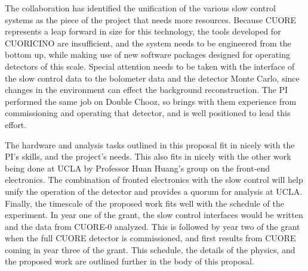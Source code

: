 The collaboration has identified the unification of the various slow control systems as the piece of the project that needs more resources. Because CUORE represents a leap forward in size for this technology, the tools developed for CUORICINO are insufficient, and the system needs to be engineered from the bottom up, while making use of new software packages designed for operating detectors of this scale. Special attention needs to be taken with the interface of the slow control data to the bolometer data and the detector Monte Carlo, since changes in the environment can effect the background reconstruction. The PI performed the same job on Double Chooz, so brings with them experience from commissioning and operating that detector, and is well positioned to lead this effort.    

The hardware and analysis tasks outlined in this proposal fit in nicely with the PI's skills, and the project's needs. This also fits in nicely with the other work being done at UCLA  by Professor Huan Huang's group on the front-end electronics. The combination of fronted electronics with the slow control will help unify the operation of the detector and provides a quorum  for analysis at UCLA. Finally, the timescale of the proposed work fits well with the schedule of the experiment. In year one of the grant, the slow control interfaces would be written and the data from CUORE-0 analyzed. This is followed by year two of the grant when the full CUORE detector is commissioned, and first results from CUORE coming in year three of the grant. This schedule, the details of the physics, and the proposed work are outlined further in the body of this proposal.
